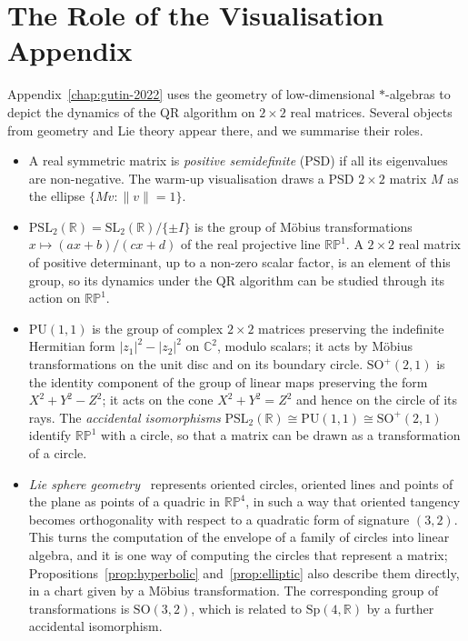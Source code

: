 \documentclass[12pt, a4paper]{report}
\theoremstyle{plain}
\theoremstyle{definition}
\theoremstyle{remark}
\theoremstyle{plain}
\newcommand{\RR}{\mathbb{R}}
\newcommand{\CC}{\mathbb{C}}
\newcommand{\RP}{\mathbb{RP}}
\newcommand{\PSL}{\mathrm{PSL}}
\newcommand{\SL}{\mathrm{SL}}
\newcommand{\PU}{\mathrm{PU}}
\newcommand{\SO}{\mathrm{SO}}
\newcommand{\Sp}{\mathrm{Sp}}
\begin{document}
\section{The Role of the Visualisation Appendix}
\label{sec:appendix-summary}
Appendix~\ref{chap:gutin-2022} uses the geometry of low-dimensional $*$-algebras to depict the dynamics of the QR algorithm on $2\times2$ real matrices. Several objects from geometry and Lie theory appear there, and we summarise their roles.
\begin{itemize}
  \item A real symmetric matrix is \emph{positive semidefinite} (PSD) if all its eigenvalues are non-negative. The warm-up visualisation draws a PSD $2\times2$ matrix $M$ as the ellipse $\{Mv:\|v\|=1\}$.
  \item $\PSL_2(\RR)=\SL_2(\RR)/\{\pm I\}$ is the group of M\"obius transformations $x\mapsto(ax+b)/(cx+d)$ of the real projective line $\RP^1$. A $2\times2$ real matrix of positive determinant, up to a non-zero scalar factor, is an element of this group, so its dynamics under the QR algorithm can be studied through its action on $\RP^1$.
  \item $\PU(1,1)$ is the group of complex $2\times2$ matrices preserving the indefinite Hermitian form $|z_1|^2-|z_2|^2$ on $\CC^2$, modulo scalars; it acts by M\"obius transformations on the unit disc and on its boundary circle. $\SO^+(2,1)$ is the identity component of the group of linear maps preserving the form $X^2+Y^2-Z^2$; it acts on the cone $X^2+Y^2=Z^2$ and hence on the circle of its rays. The \emph{accidental isomorphisms} $\PSL_2(\RR)\cong\PU(1,1)\cong\SO^+(2,1)$ identify $\RP^1$ with a circle, so that a matrix can be drawn as a transformation of a circle.
  \item \emph{Lie sphere geometry}~\cite{cecil1992lie} represents oriented circles, oriented lines and points of the plane as points of a quadric in $\RP^4$, in such a way that oriented tangency becomes orthogonality with respect to a quadratic form of signature $(3,2)$. This turns the computation of the envelope of a family of circles into linear algebra, and it is one way of computing the circles that represent a matrix; Propositions~\ref{prop:hyperbolic} and~\ref{prop:elliptic} also describe them directly, in a chart given by a M\"obius transformation. The corresponding group of transformations is $\SO(3,2)$, which is related to $\Sp(4,\RR)$ by a further accidental isomorphism.
\end{itemize}
\end{document}

